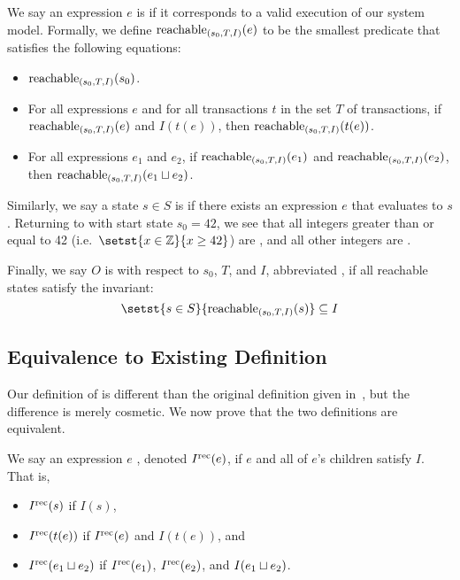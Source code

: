 {}

We say an expression $e$ is  if it corresponds to a
valid execution of our system model. Formally, we define
$\text{reachable}_{(s_0, T, I)}(e)$ to be the smallest predicate that satisfies the
following equations:
\begin{itemize}
  \item
    $\text{reachable}_{(s_0, T, I)}(s_0)$.
  \item
    For all expressions $e$ and for all transactions $t$ in the set $T$ of
    transactions, if $\text{reachable}_{(s_0, T, I)}(e)$ and $I(t(e))$, then
    $\text{reachable}_{(s_0, T, I)}(t(e))$.
  \item
    For all expressions $e_1$ and $e_2$, if $\text{reachable}_{(s_0, T, I)}(e_1)$ and
    $\text{reachable}_{(s_0, T, I)}(e_2)$, then $\text{reachable}_{(s_0, T, I)}(e_1 \sqcup
    e_2)$.
\end{itemize}
Similarly, we say a state $s \in S$ is \sTIreachable{} if there exists an
\sTIreachable{} expression $e$ that evaluates to $s$. Returning to
 with start state $s_0 = 42$, we see that all integers greater
than or equal to 42 (i.e.\ $\setst{x \in \ints}{x \geq 42}$) are
\sTIreachable{}, and all other integers are \sTIunreachable{}.

Finally, we say $O$ is  with respect to $s_0$,
$T$, and $I$, abbreviated , if all reachable states
satisfy the invariant:
\[
  \hfill
  \setst{s \in S}{\sTIreachablepredicate{s}} \subseteq I
  \hfill
\]

\subsection{Equivalence to Existing Definition}
Our definition of \invariantconfluence{} is different than the original
definition given in~\cite{bailis2014coordination}, but the difference is merely
cosmetic. We now prove that the two definitions are equivalent.

We say an expression $e$ , denoted
$I^{\text{rec}}(e)$, if $e$ and all of $e$'s children satisfy $I$. That is,
\begin{itemize}
  \item
    $I^{\text{rec}}(s)$ if $I(s)$,

  \item
    $I^{\text{rec}}(t(e))$ if $I^{\text{rec}}(e)$ and $I(t(e))$, and

  \item
    $I^{\text{rec}}(e_1 \sqcup e_2)$ if $I^{\text{rec}}(e_1)$, $I^{\text{rec}}(e_2)$, and $I(e_1 \sqcup
    e_2)$.
\end{itemize}

